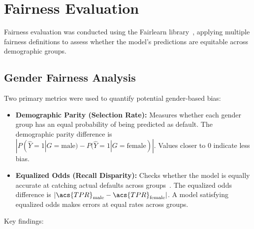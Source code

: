 \section{Fairness Evaluation}
\label{sec:fairness_eval}

Fairness evaluation was conducted using the Fairlearn library~\cite{bird2020}, applying multiple fairness definitions to assess whether the model's predictions are equitable across demographic groups.

\subsection{Gender Fairness Analysis}

Two primary metrics were used to quantify potential gender-based bias:

\begin{itemize}
    \item \textbf{Demographic Parity (Selection Rate):} Measures whether each gender group has an equal probability of being predicted as default. The demographic parity difference is $|P(\hat{Y}=1|G=\text{male}) - P(\hat{Y}=1|G=\text{female})|$. Values closer to 0 indicate less bias.
    \item \textbf{Equalized Odds (Recall Disparity):} Checks whether the model is equally accurate at catching actual defaults across groups~\cite{hardt2016}. The equalized odds difference is $|\acs{TPR}_\text{male} - \acs{TPR}_\text{female}|$. A model satisfying equalized odds makes errors at equal rates across groups.
\end{itemize}





Key findings:

